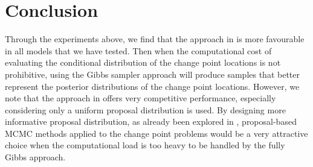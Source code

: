 

\section{Conclusion}

Through the experiments above, we find that the approach in \cite{carlin1992hierarchical} is more favourable in all models that we have tested. Then when the computational cost of evaluating the conditional distribution of the change point locations is not prohibitive, using the Gibbs sampler approach will produce samples that better represent the posterior distributions of the change point locations. However, we note that the approach in \cite{antoch2008application} offers very competitive performance, especially considering only a uniform proposal distribution is used. By designing more informative proposal distribution, as already been explored in \cite{benson2018adaptive}, proposal-based MCMC methods applied to the change point problems would be a very attractive choice when the computational load is too heavy to be handled by the fully Gibbs approach.

